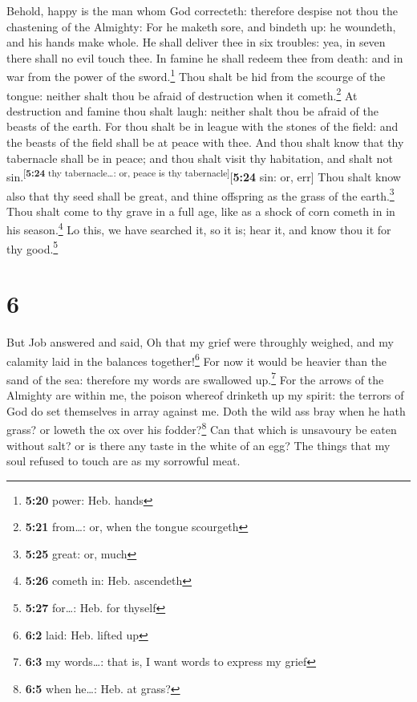  Behold, happy is the man whom God correcteth: therefore
despise not thou the chastening of the Almighty:  For he
maketh sore, and bindeth up: he woundeth, and his hands make whole.
 He shall deliver thee in six troubles: yea, in seven
there shall no evil touch thee.  In famine he shall
redeem thee from death: and in war from the power of the
sword.\footnote{\textbf{5:20} power: Heb. hands}  Thou
shalt be hid from the scourge of the tongue: neither shalt thou be
afraid of destruction when it cometh.\footnote{\textbf{5:21} from\ldots:
  or, when the tongue scourgeth}  At destruction and
famine thou shalt laugh: neither shalt thou be afraid of the beasts of
the earth.  For thou shalt be in league with the stones
of the field: and the beasts of the field shall be at peace with thee.
 And thou shalt know that thy tabernacle shall be in
peace; and thou shalt visit thy habitation, and shalt not
sin.\textsuperscript{{[}\textbf{5:24} thy tabernacle\ldots: or, peace is
thy tabernacle{]}}{[}\textbf{5:24} sin: or, err{]}  Thou
shalt know also that thy seed shall be great, and thine offspring as the
grass of the earth.\footnote{\textbf{5:25} great: or, much}
 Thou shalt come to thy grave in a full age, like as a
shock of corn cometh in in his season.\footnote{\textbf{5:26} cometh in:
  Heb. ascendeth}  Lo this, we have searched it, so it
is; hear it, and know thou it for thy good.\footnote{\textbf{5:27}
  for\ldots: Heb. for thyself}

\hypertarget{section-5}{%
\section{6}\label{section-5}}

 But Job answered and said,  Oh that my
grief were throughly weighed, and my calamity laid in the balances
together!\footnote{\textbf{6:2} laid: Heb. lifted up}  For
now it would be heavier than the sand of the sea: therefore my words are
swallowed up.\footnote{\textbf{6:3} my words\ldots: that is, I want
  words to express my grief}  For the arrows of the
Almighty are within me, the poison whereof drinketh up my spirit: the
terrors of God do set themselves in array against me. 
Doth the wild ass bray when he hath grass? or loweth the ox over his
fodder?\footnote{\textbf{6:5} when he\ldots: Heb. at grass?}
 Can that which is unsavoury be eaten without salt? or is
there any taste in the white of an egg?  The things that
my soul refused to touch are as my sorrowful meat.

